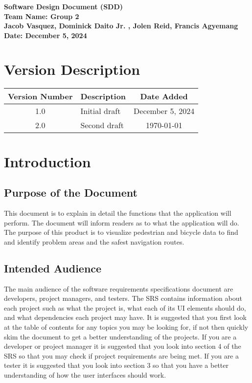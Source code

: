 \documentclass[a4paper,12pt]{article}
\begin{document}
\begin{titlepage}
    \centering
    {\Huge \textbf{Software Design Document (SDD)}}\\
    \vspace{2cm}
    \textbf{Team Name: Group 2}\\
    
    \textbf{Jacob Vasquez, Dominick Daito Jr. , Jolen Reid, Francis Agyemang}\\
    \vspace{1cm}
    \textbf{Date: December 5, 2024}\\
    
\end{titlepage}

\tableofcontents
\newpage

\section*{Version Description}
\begin{longtable}{|c|p{8cm}|c|}
\hline
\textbf{Version Number} & \textbf{Description} & \textbf{Date Added} \\
\hline
1.0 & Initial draft & December 5, 2024 \\
\hline
2.0 & Second draft & \today \\
\hline
\end{longtable}

\section{Introduction}
\subsection{Purpose of the Document}
This document is to explain in detail the functions that the application will perform. The
document will inform readers as to what the application will do. The purpose of this product is to
visualize pedestrian and bicycle data to find and identify problem areas and the safest navigation
routes.
\subsection{Intended Audience}
The main audience of the software requirements specifications document are developers, project
managers, and testers. The SRS contains information about each project such as what the project
is, what each of its UI elements should do, and what dependencies each project may have. It is
suggested that you first look at the table of contents for any topics you may be looking for, if not
then quickly skim the document to get a better understanding of the projects. If you are a
developer or project manager it is suggested that you look into section 4 of the SRS so that you
may check if project requirements are being met. If you are a tester it is suggested that you look
into section 3 so that you have a better understanding of how the user interfaces should work.
\end{document}
